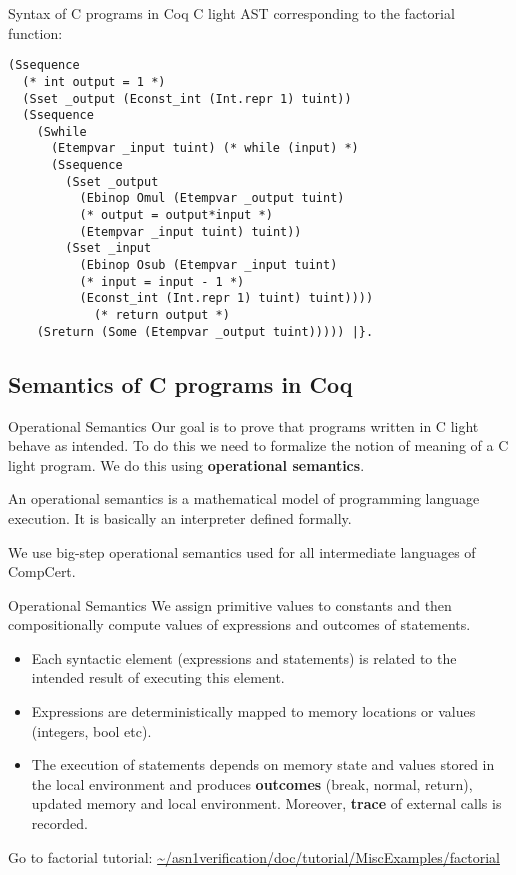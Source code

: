 \documentclass[10pt]{beamer}
\begin{document}
\begin{frame}[fragile]{ Syntax of C programs in Coq}
C light AST corresponding to the factorial function: 
  \begin{lstlisting}[language=Coq]
(Ssequence
  (* int output = 1 *)
  (Sset _output (Econst_int (Int.repr 1) tuint)) 
  (Ssequence 
    (Swhile 
      (Etempvar _input tuint) (* while (input) *)
      (Ssequence  
        (Sset _output
          (Ebinop Omul (Etempvar _output tuint) 
          (* output = output*input *)
          (Etempvar _input tuint) tuint)) 
        (Sset _input
          (Ebinop Osub (Etempvar _input tuint) 
          (* input = input - 1 *)
          (Econst_int (Int.repr 1) tuint) tuint))))
            (* return output *)
    (Sreturn (Some (Etempvar _output tuint))))) |}.
     \end{lstlisting}
     
\end{frame}


\subsection{Semantics of C programs in Coq}

  \begin{frame}{Operational Semantics}
    Our goal is to prove that programs written in C light behave as intended. To do this we need to formalize the notion of meaning of a C light program. We do this using {\bf operational semantics}.

    \bigskip
    
    An operational semantics is a mathematical model of programming language execution. It is basically an interpreter defined formally.
    \bigskip
    
    We use big-step operational semantics used for all intermediate languages of CompCert.
  \end{frame}
  
  \begin{frame}{Operational Semantics}
    We assign primitive values to constants and then compositionally compute values of expressions and outcomes of statements.
   \begin{itemize}
    \item Each syntactic element (expressions and statements) is related to the intended result of executing this element.    
    \item Expressions are deterministically mapped to memory locations or values (integers, bool etc).
    \item The execution of statements depends on memory state and values stored in the local environment and produces {\bf outcomes} (break, normal, return), updated memory and local environment. Moreover, {\bf trace} of external calls is recorded.
      \end{itemize}
    \end{frame}
    \begin{frame}
      Go to factorial tutorial: \url{~/asn1verification/doc/tutorial/MiscExamples/factorial}
    \end{frame}
\end{document}
